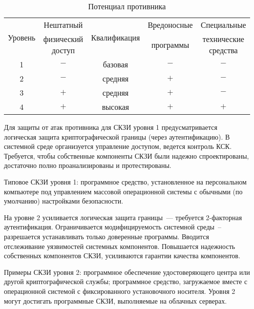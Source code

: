 
\begin{table}[hbt]
\caption{Потенциал противника}\label{Table.COMMON.Levels}
\begin{tabular}{|c|c|c|c|c|}
\hline
\multirow{2}{*}{Уровень} 
& Нештатный & \multirow{2}{*}{Квалификация} & Вредоносные & Специальные\\
& физический доступ & & программы & технические средства\\
\hline
\hline
1 & $-$ & базовая & $-$ & $-$\\
2 & $-$ & средняя & $+$ & $-$\\
3 & $+$ & средняя & $+$ & $-$\\
4 & $+$ & высокая & $+$ & $+$\\
\hline
\end{tabular}
\end{table}

Для защиты от атак противника для СКЗИ уровня 1 предусматривается логическая 
защита криптографической границы (через аутентификацию).
%
В системной среде организуется управление доступом, ведется контроль КСК.
% 
%
Требуется, чтобы собственные компоненты СКЗИ были надежно спроектированы,
достаточно полно проанализированы и протестированы.

Типовое СКЗИ уровня 1: программное средство, установленное на персональном
компьютере под управлением массовой операционной системы с обычными
(по умолчанию) настройками безопасности.

На уровне 2 усиливается логическая защита границы~--- требуется 2-факторная 
аутентификация.
%
Ограничивается модифицируемость системной среды~-- разрешается устанавливать 
только доверенные программы.
%
%
Вводится отслеживание уязвимостей системных компонентов.
%
Повышается надежность собственных компонентов СКЗИ, 
%
%
усиливаются гарантии качества компонентов.
%

Примеры СКЗИ уровня 2: 
программное обеспечение удостоверяющего центра или другой криптографической службы;
%
программное средство, загружаемое вместе с операционной системой с 
фиксированного установочного носителя.
% 
%
Уровня 2 могут достигать программные СКЗИ, выполняемые на облачных серверах.

